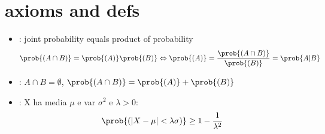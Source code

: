 \chapter{axioms and defs}
\begin{itemize}
\item {}: joint probability equals product of probability
\[\prob{(A\cap B)}=\prob{(A)}\prob{(B)}\Leftrightarrow \prob{(A)}=\frac{\prob{(A\cap B)}}{\prob{(B)}}=\prob{A|B}\]
\item {}: $A\cap B=\emptyset$, $\prob{(A\cap B)}=\prob{(A)}+\prob{(B)}$
\item {}: X ha media $\mu$ e var $\sigma^2$ e $\lambda>0$:
\[\prob{(|X-\mu|<\lambda\sigma)}\geq1-\frac{1}{\lambda^2}\]

\end{itemize}
